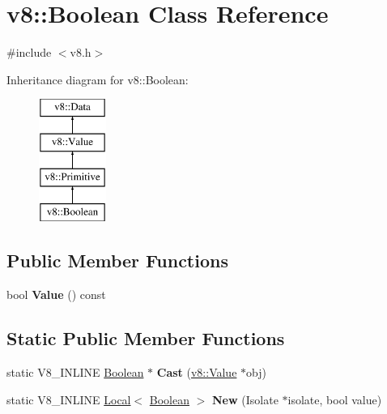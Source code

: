 \hypertarget{classv8_1_1Boolean}{}\section{v8\+:\+:Boolean Class Reference}
\label{classv8_1_1Boolean}


{\ttfamily \#include $<$v8.\+h$>$}

Inheritance diagram for v8\+:\+:Boolean\+:\begin{figure}[H]
\begin{center}
\leavevmode
\includegraphics[height=4.000000cm]{classv8_1_1Boolean}
\end{center}
\end{figure}
\subsection*{Public Member Functions}
\begin{DoxyCompactItemize}
\item 
\mbox{\label{classv8_1_1Boolean_a4d6e813daf80df3710518f5389cb7da5}} 
bool {\bfseries Value} () const
\end{DoxyCompactItemize}
\subsection*{Static Public Member Functions}
\begin{DoxyCompactItemize}
\item 
\mbox{\label{classv8_1_1Boolean_a92493565c4b9400825a0ff09780d7ff4}} 
static V8\+\_\+\+I\+N\+L\+I\+NE \mbox{\hyperlink{classv8_1_1Boolean}{Boolean}} $\ast$ {\bfseries Cast} (\mbox{\hyperlink{classv8_1_1Value}{v8\+::\+Value}} $\ast$obj)
\item 
\mbox{\label{classv8_1_1Boolean_aeb32aa1bf1853bc4c5f076ee6a8b9a0f}} 
static V8\+\_\+\+I\+N\+L\+I\+NE \mbox{\hyperlink{classv8_1_1Local}{Local}}$<$ \mbox{\hyperlink{classv8_1_1Boolean}{Boolean}} $>$ {\bfseries New} (Isolate $\ast$isolate, bool value)
\end{DoxyCompactItemize}


